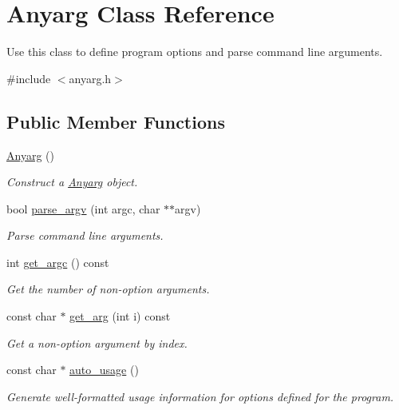 \hypertarget{class_anyarg}{}\section{Anyarg Class Reference}
\label{class_anyarg}


Use this class to define program options and parse command line arguments.  




{\ttfamily \#include $<$anyarg.\+h$>$}

\subsection*{Public Member Functions}
\begin{DoxyCompactItemize}
\item 
\hyperlink{class_anyarg_a6d4bbf6e762e77d89ffa7756359b6a62}{Anyarg} ()
\begin{DoxyCompactList}\small\item\em Construct a \hyperlink{class_anyarg}{Anyarg} object. \end{DoxyCompactList}\item 
bool \hyperlink{class_anyarg_ab38a13c5d241224bb14d8e474bbe70de}{parse\+\_\+argv} (int argc, char $\ast$$\ast$argv)
\begin{DoxyCompactList}\small\item\em Parse command line arguments. \end{DoxyCompactList}\item 
int \hyperlink{class_anyarg_a3cffbadc85f2fd4086e9a91ac1c5d666}{get\+\_\+argc} () const 
\begin{DoxyCompactList}\small\item\em Get the number of non-\/option arguments. \end{DoxyCompactList}\item 
const char $\ast$ \hyperlink{class_anyarg_a98c55821efc66a45f1132ffa90689928}{get\+\_\+arg} (int i) const 
\begin{DoxyCompactList}\small\item\em Get a non-\/option argument by index. \end{DoxyCompactList}\item 
const char $\ast$ \hyperlink{class_anyarg_a1dd740c033f8ff539dc2c6f4001e11f9}{auto\+\_\+usage} ()
\begin{DoxyCompactList}\small\item\em Generate well-\/formatted usage information for options defined for the program. \end{DoxyCompactList}\end{DoxyCompactItemize}
